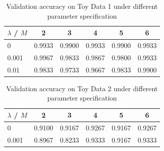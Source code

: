 \begin{table}[h!]
\centering
\caption{Validation accuracy on Toy Data 1 under different parameter specification}\label{tab:toy_1_cv}
\begin{tabular}{ lccccc }
\hline\hline
$\lambda$ / $M$ 		& 2 		& 3			&4			&5		&6\\
\hline
0 				& 0.9933    & 0.9900    & 0.9933   &  0.9900  &   0.9933\\
0.001 			& 0.9967    & 0.9833    & 0.9867    & 0.9800   &  0.9933\\
0.01				& 0.9833    & 0.9733    & 0.9667    & 0.9833   & 0.9900\\
\hline\hline
\end{tabular}
\end{table}
         
         
\begin{table}[h!]
\centering
\caption{Validation accuracy on Toy Data 2 under different parameter specification}\label{tab:toy_2_cv}
\begin{tabular}{ lccccc }
\hline\hline
$\lambda$ / $M$ 		& 2 		& 3			&4			&5		&6\\
\hline         
0    & 0.9100    & 0.9167    & 0.9267    & 0.9167    & 0.9267\\
0.001    & 0.8967    & 0.8233    & 0.9333    & 0.9167    & 0.9333\\
\hline\hline
\end{tabular}
\end{table}
